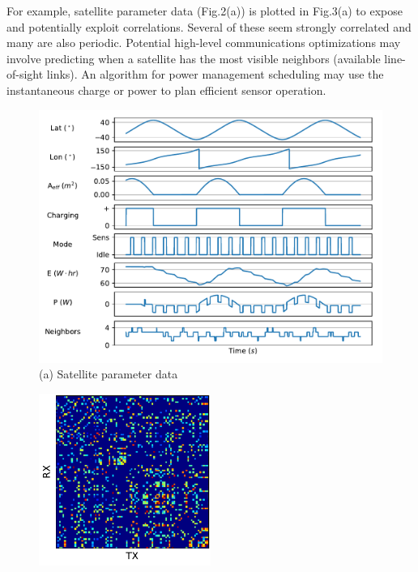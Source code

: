 \documentclass[conference]{IEEEtran}
\begin{document}
For example, satellite parameter data (Fig.2(a)) is plotted in Fig.3(a) to
expose and potentially exploit correlations.  Several of these seem strongly
correlated and many are also periodic.  Potential high-level communications
optimizations may involve predicting when a satellite has the most visible
neighbors (available line-of-sight links).  An algorithm for power management
scheduling may use the instantaneous charge or power to plan efficient sensor
operation.

\begin{figure}[t]
  \begin{minipage}[b]{\linewidth}
    \begin{center}
      \includegraphics[width=\textwidth]{images/param_plot.pdf} \\
      {\footnotesize(a) Satellite parameter data}
    \end{center}
    \medskip
  \end{minipage}
  \begin{minipage}[b]{\linewidth}
    \begin{center}
      \includegraphics[width=0.5\textwidth]{images/weighted_plot.pdf} \\

\end{center}
\end{minipage}
\end{figure}
\end{document}
